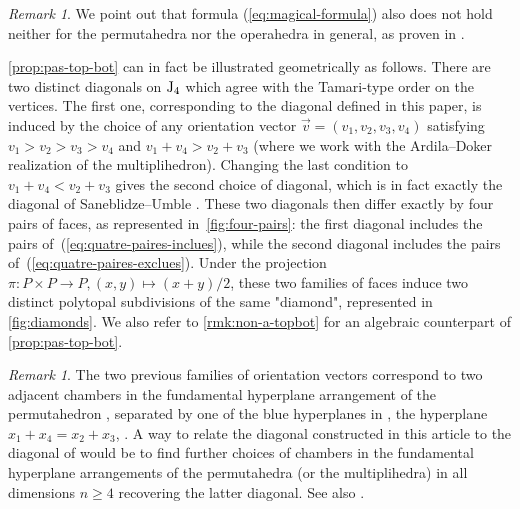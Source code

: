\documentclass[twoside, 12pt]{amsart}
\theoremstyle{remark}
\newtheorem{remark}[definition]{\sc Remark}
\begin{document}
\begin{remark}
We point out that formula (\ref{eq:magical-formula}) also does not hold neither for the permutahedra nor the operahedra in general, as proven in \cite[Section 3.2]{LA21}. 
\end{remark}

\cref{prop:pas-top-bot} can in fact be illustrated geometrically as follows. 
There are two distinct diagonals on $\mathrm{J}_4$ which agree with the Tamari-type order on the vertices. 
The first one, corresponding to the diagonal defined in this paper, is induced by the choice of any orientation vector $\vec v=(v_1,v_2,v_3,v_4)$ satisfying $v_1>v_2>v_3>v_4$ and $v_1 + v_4 > v_2+v_3$ (where we work with the Ardila--Doker realization of the multiplihedron).
Changing the last condition to $v_1 + v_4 < v_2+v_3$ gives the second choice of diagonal, which is in fact exactly the diagonal of Saneblidze--Umble \cite[Section 5]{SaneblidzeUmble04}. 
These two diagonals then differ exactly by four pairs of faces, as represented in~\cref{fig:four-pairs}: the first diagonal includes the pairs of~(\ref{eq:quatre-paires-inclues}), while the second diagonal includes the pairs of~(\ref{eq:quatre-paires-exclues}).
Under the projection $\pi : P\times P \to P, (x,y) \mapsto (x+y)/2$, these two families of faces induce two distinct polytopal subdivisions of the same "diamond", represented in \cref{fig:diamonds}. 
We also refer to \cref{rmk:non-a-topbot} for an algebraic counterpart of \cref{prop:pas-top-bot}.

\begin{remark}
  The two previous families of orientation vectors correspond to two adjacent chambers in the fundamental hyperplane arrangement of the permutahedron \cite[Theorem 3.6]{LA21}, separated by one of the blue hyperplanes in \cite[Figure 12]{LA21}, the hyperplane $x_1+x_4=x_2+x_3$, .
  A way to relate the diagonal constructed in this article to the diagonal of \cite[Section 5]{SaneblidzeUmble04} would be to find further choices of chambers in the fundamental hyperplane arrangements of the permutahedra (or the multiplihedra) in all dimensions $n \geq 4$ recovering the latter diagonal. See also \cite[Remark~3.18]{LA21}.
\end{remark}
\end{document}
